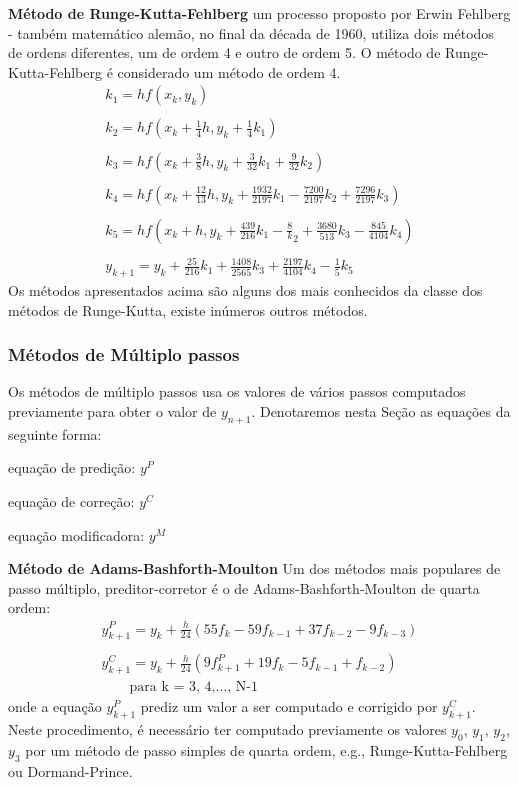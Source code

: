 \textbf{Método de Runge-Kutta-Fehlberg} um processo proposto por Erwin Fehlberg - também matemático alemão, no final 
da década de 1960, utiliza dois métodos de ordens diferentes, um de ordem 4 e outro de
ordem 5. O método de Runge-Kutta-Fehlberg é considerado um método de ordem 4.
\begin{equation*}
\begin{split}
k_{1} = hf(x_{k}, y_{k})\\
\\
k_{2} = hf(x_{k} + \frac{1}{4}h, y_{k} + \frac{1}{4}k_{1})\\
\\
k_{3} = hf(x_{k} + \frac{3}{8}h, y_{k} + \frac{3}{32}k_{1} + \frac{9}{32}k_{2})\\
\\
k_{4} = hf(x_{k} + \frac{12}{13}h, y_{k} + \frac{1932}{2197}k_{1} - \frac{7200}{2197}k_{2} + \frac{7296}{2197}k_{3})\\
\\
k_{5} = hf(x_{k} + h, y_{k} + \frac{439}{216}k_{1} - \frac{8}k_{2} + \frac{3680}{513}k_{3} - \frac{845}{4104}k_{4})\\
\\
y_{k+1} = y_{k} + \frac{25}{216}k_{1} + \frac{1408}{2565}k_{3} + \frac{2197}{4104}k_{4} - \frac{1}{5}k_{5}
\end{split}
\end{equation*}
Os métodos apresentados acima são alguns dos mais conhecidos da classe dos métodos
de Runge-Kutta, existe inúmeros outros métodos.

\subsubsection{Métodos de Múltiplo passos}
Os métodos de múltiplo passos usa os valores de vários passos computados 
previamente para obter o valor de $y_{n+1}$.
Denotaremos nesta Seção as equações da seguinte forma:

equação de predição: $y^{P}$

equação de correção: $y^{C}$

equação modificadora: $y^{M}$

\textbf{Método de Adams-Bashforth-Moulton} Um dos métodos mais populares de passo múltiplo, preditor-corretor é o de 
Adams-Bashforth-Moulton de quarta ordem:
\begin{equation*}
\begin{split}
y^{P}_{k+1} = y_{k} + \frac{h}{24}(55f_{k} - 59f_{k-1} + 37f_{k-2} - 9f_{k-3})\\
\\
y^{C}_{k+1} = y_{k} + \frac{h}{24}(9f^{P}_{k+1} + 19f_{k} - 5f_{k-1} + f_{k-2})\\
\qquad \text{para k = 3, 4,$\dotsc$, N-1}
\end{split}
\end{equation*}
onde a equação $y^{P}_{k+1}$ prediz um valor a ser computado e corrigido por $y^{C}_{k+1}$.
Neste procedimento, é necessário ter computado previamente os valores $y_{0}$, $y_{1}$, $y_{2}$, $y_{3}$ por um
método de passo simples de quarta ordem, e.g., Runge-Kutta-Fehlberg ou Dormand-Prince. 

